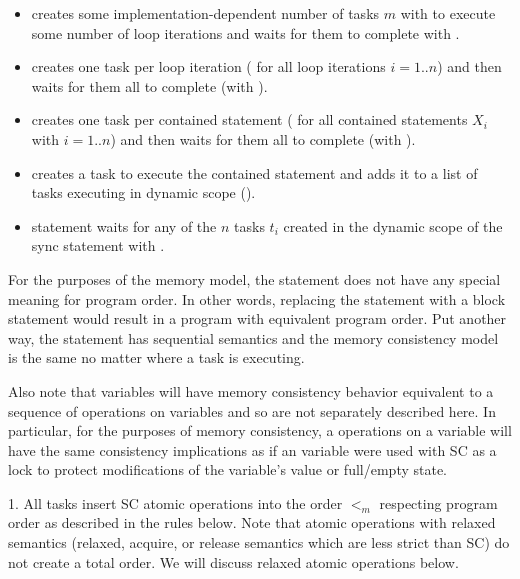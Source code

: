 \begin{itemize}

  \item {} creates some implementation-dependent number of tasks $m$
with  to execute some number of loop
iterations and waits for them to complete with .

  \item {} creates one task per loop iteration ( for all loop iterations $i=1..n$) and then waits for them
all to complete (with ).

  \item {} creates one task per contained statement ( for all contained statements $X_i$ with $i=1..n$) and then
waits for them all to complete (with ).

  \item {} creates a task to execute the contained statement and adds
it to a list of tasks executing in dynamic scope ().

  \item {} statement waits for any of the $n$ tasks $t_i$ created in
the dynamic scope of the sync statement with .

\end{itemize}

For the purposes of the memory model, the  statement does not have any
special meaning for program order. In other words, replacing the 
statement with a block statement would result in a program with equivalent
program order. Put another way, the  statement has sequential
semantics and the memory consistency model is the same no matter where a task
is executing.

Also note that  variables will have memory consistency behavior
equivalent to a sequence of operations on  variables and so are
not separately described here. In particular, for the purposes of memory
consistency, a operations on a  variable will have the same
consistency implications as if an  variable were used with
SC as a lock to protect modifications of the 
variable's value or full/empty state.


1. All tasks insert SC atomic operations into the order $<_m$ respecting
program order as described in the rules below. Note that atomic operations with
relaxed semantics (relaxed, acquire, or release semantics which are less strict
than SC) do not create a total order. We will discuss relaxed atomic operations
below.

